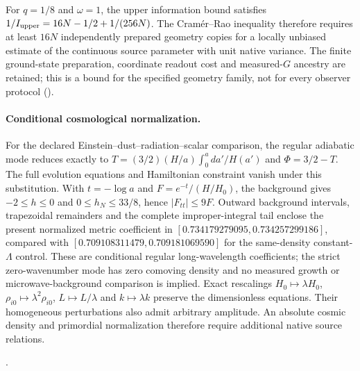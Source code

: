 For $q=1/8$ and $\omega=1$, the upper information bound satisfies
$1/I_{\rm upper}=16N-1/2+1/(256N)$. The Cram\'er--Rao inequality
therefore requires at least $16N$ independently prepared geometry copies
for a locally unbiased estimate of the continuous source parameter with
unit native variance. The finite ground-state preparation, coordinate
readout cost and measured-$G$ ancestry are retained; this is a bound for
the specified geometry family, not for every observer protocol
().

\paragraph{Conditional cosmological normalization.}
For the declared Einstein--dust--radiation--scalar comparison, the regular
adiabatic mode reduces exactly to
$T=(3/2)(H/a)\int_0^a da'/H(a')$ and $\Phi=3/2-T$.
The full evolution equations and Hamiltonian constraint vanish under this
substitution. With $t=-\log a$ and $F=e^{-t}/(H/H_0)$, the background gives
$-2\leq h\leq0$ and $0\leq h_N\leq33/8$, hence $|F_{tt}|\leq9F$.
Outward background intervals, trapezoidal remainders and the complete
improper-integral tail enclose the present normalized metric coefficient
in $[0.734179279095,0.734257299186]$, compared with
$[0.709108311479,0.709181069590]$ for the same-density constant-$\Lambda$
control. These are conditional regular long-wavelength coefficients;
the strict zero-wavenumber mode has zero comoving density and no measured
growth or microwave-background comparison is implied. Exact rescalings
$H_0\mapsto\lambda H_0$, $\rho_{i0}\mapsto\lambda^2\rho_{i0}$,
$L\mapsto L/\lambda$ and $k\mapsto\lambda k$ preserve the dimensionless
equations. Their homogeneous perturbations also admit arbitrary amplitude.
An absolute cosmic density and primordial normalization therefore require
additional native source relations.

.

